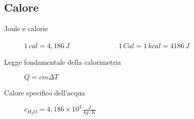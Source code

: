 \documentclass[a4paper,11pt,italian]{article}
\begin{document}
\subsection{Calore}

\begin{description}
  \item[Joule e calorie] $ 1 \, cal = 4,186 \, J $~~~~~~~~~~~~~~$ 1 \, Cal = 1 \, kcal = 4186 \, J $
  
  \item[Legge fondamentale della calorimetria] $ Q = cm \Delta T $
  
  \item[Calore specifico dell'acqua] $ c_{H_2O} = 4,186 \times 10^3 \, \frac{J}{kg \cdot K} $
  
  
%
%


\end{description}
\end{document}
